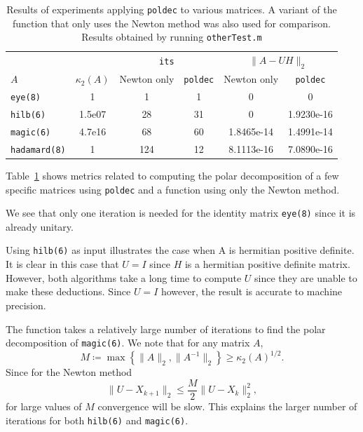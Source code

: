 \documentclass[10pt, A4paper]{article}
\begin{document}
\begin{table}[h]
	\centering
	\begin{tabular}{ l c c c c c }
		\toprule
		& & \multicolumn{2}{c}{\texttt{its}} & 
		\multicolumn{2}{c}{$\|A-UH\|_2$} \\
		\cmidrule(lr){3-4} \cmidrule(lr{12pt}){5-6}
		$A$ & $\kappa_2(A)$ & Newton only & \texttt{poldec} & Newton only 
		& 
		\texttt{poldec} \\
		\midrule
		\texttt{eye(8)} & 1 & 1 & 1 & 0 & 0 \\
		\texttt{hilb(6)} & 1.5e07 & 28 & 31 & 0 & 1.9230e-16 \\
		\texttt{magic(6)} & 4.7e16 & 68 & 60 & 1.8465e-14 & 
		1.4991e-14 \\
		\texttt{hadamard(8)} & 1 & 124 & 12 & 8.1113e-16 & 7.0890e-16\\
		\bottomrule
	\end{tabular}
	\caption{
	Results of experiments applying \texttt{poldec} 
	to	various matrices. A variant of the function that only uses the 
	Newton method was also used for comparison. Results obtained by 
	running \texttt{otherTest.m}
	\label{tab:poldecresults}}
\end{table}

Table~\ref{tab:poldecresults} shows metrics related to computing the 
polar decomposition of a few specific matrices using \texttt{poldec} 
and a function using only the Newton method.

We see that only one iteration is needed for the identity matrix 
\texttt{eye(8)} since it is already unitary.

Using \texttt{hilb(6)} as input illustrates the case when A is hermitian 
positive definite.
It is clear in this case that $U = I$ since $H$ is a hermitian positive 
definite matrix.
However, both algorithms take a long time to compute $U$ since they are 
unable to make these deductions. Since $U= I$ however, the 
result is accurate to machine precision.

The function takes a relatively large number of iterations to find the 
polar decomposition of \texttt{magic(6)}. We note that for any matrix $A$,
$$M \coloneqq \max \left\{\|A\|_2, \|A^{-1}\|_2 \right\} \geq 
\kappa_2(A)^{1/2}.$$
Since for the Newton method
$$\|U - X_{k+1}\|_2 \leq \frac{M}{2} \|U - X_k\|_2^2,$$
for large values of $M$ convergence will be slow.
This explains the larger number of iterations for both \texttt{hilb(6)} 
and \texttt{magic(6)}.
\end{document}
